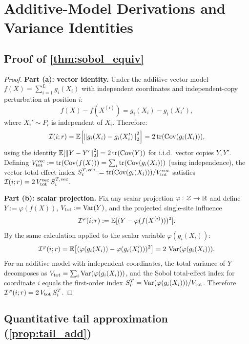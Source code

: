 \section{Additive-Model Derivations and Variance Identities}\label{app:additive}

\subsection{Proof of \texorpdfstring{\cref{thm:sobol_equiv}}{Theorem: Sobol Equivalence}}

\begin{proof}
\textbf{Part (a): vector identity.} Under the additive vector model $f(X) = \sum_{i=1}^L g_i(X_i)$ with independent coordinates and independent-copy perturbation at position $i$:
\[
f(X) - f(X^{(i)}) = g_i(X_i) - g_i(X_i'),
\]
where $X_i' \sim P_i$ is independent of $X_i$. Therefore:
\[
\mathcal{I}(i;r) = \mathbb{E}\!\left[\left\lVert g_i(X_i) - g_i(X_i') \right\rVert_2^2\right] = 2\,\mathrm{tr}(\operatorname{Cov}(g_i(X_i))),
\]
using the identity $\mathbb{E}[\left\lVert Y-Y' \right\rVert_2^2] = 2\,\mathrm{tr}(\operatorname{Cov}(Y))$ for i.i.d.\ vector copies $Y, Y'$. Defining $V_{\mathrm{tot}}^{\mathrm{vec}} := \mathrm{tr}(\operatorname{Cov}(f(X))) = \sum_i \mathrm{tr}(\operatorname{Cov}(g_i(X_i)))$ (using independence), the vector total-effect index $S_i^{T,\mathrm{vec}} := \mathrm{tr}(\operatorname{Cov}(g_i(X_i)))/V_{\mathrm{tot}}^{\mathrm{vec}}$ satisfies $\mathcal{I}(i;r) = 2\,V_{\mathrm{tot}}^{\mathrm{vec}}\, S_i^{T,\mathrm{vec}}$.

\textbf{Part (b): scalar projection.} Fix any scalar projection $\varphi:\mathcal{Z} \to \mathbb{R}$ and define $Y := \varphi(f(X))$, $V_{\mathrm{tot}} := \operatorname{Var}(Y)$, and the projected single-site influence
\[
\mathcal{I}^\varphi(i;r) := \mathbb{E}[(Y - \varphi(f(X^{(i)})))^2].
\]
By the same calculation applied to the scalar variable $\varphi(g_i(X_i))$:
\[
\mathcal{I}^\varphi(i;r) = \mathbb{E}\!\left[(\varphi(g_i(X_i)) - \varphi(g_i(X_i')))^2\right] = 2\,\operatorname{Var}(\varphi(g_i(X_i))).
\]
For an additive model with independent coordinates, the total variance of $Y$ decomposes as $V_{\mathrm{tot}} = \sum_i \operatorname{Var}(\varphi(g_i(X_i)))$, and the Sobol total-effect index for coordinate $i$ equals the first-order index $S_i^T = \operatorname{Var}(\varphi(g_i(X_i)))/V_{\mathrm{tot}}$. Therefore $\mathcal{I}^\varphi(i;r) = 2\,V_{\mathrm{tot}}\, S_i^T$.
\end{proof}

\subsection{Quantitative tail approximation (\texorpdfstring{\cref{prop:tail_add}}{Proposition: Tail Approximation})}

